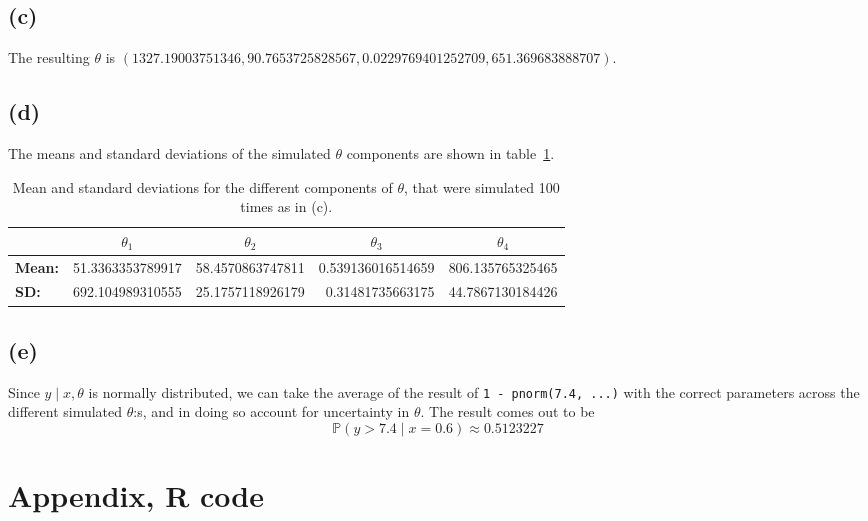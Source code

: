\documentclass{article}
\begin{document}
\subsection{(c)}
The resulting $\theta$ is
$(\num{1327.19003751346}, \num{90.7653725828567}, \num{0.0229769401252709}, \num{651.369683888707})$.

\subsection{(d)}
The means and standard deviations of the simulated $\theta$ components
are shown in table~\ref{tab:theta_means_sds}.

\begin{table}
	\caption{Mean and standard deviations for the different components of $\theta$,
	that were simulated 100 times as in (c). \label{tab:theta_means_sds}}
	\centering
	\begin{tabular}{l r r r r} \toprule
		~ & \multicolumn{1}{c}{$\theta_1$} & \multicolumn{1}{c}{$\theta_2$} & \multicolumn{1}{c}{$\theta_3$} & \multicolumn{1}{c}{$\theta_4$} \\
		\midrule
		\textbf{Mean:} &
		\num{51.3363353789917} &
		\num{58.4570863747811} &
		\num{0.539136016514659} &
		\num{806.135765325465} \\
		\textbf{SD:} &
		\num{692.104989310555} &
		\num{25.1757118926179} &
		\num{0.31481735663175} &
		\num{44.7867130184426} \\
		\bottomrule
	\end{tabular}
\end{table}

\subsection{(e)}
Since $y \mid x, \theta$ is normally distributed,
we can take the average of the result of \texttt{1 - pnorm(7.4, ...)}
with the correct parameters
across the different simulated $\theta$:s,
and in doing so account for uncertainty in $\theta$.
The result comes out to be
$$ \mathbb P(y > 7.4 \mid x = 0.6) \approx \num{0.5123227} $$

\appendix
\section{Appendix, R code}

\end{document}
